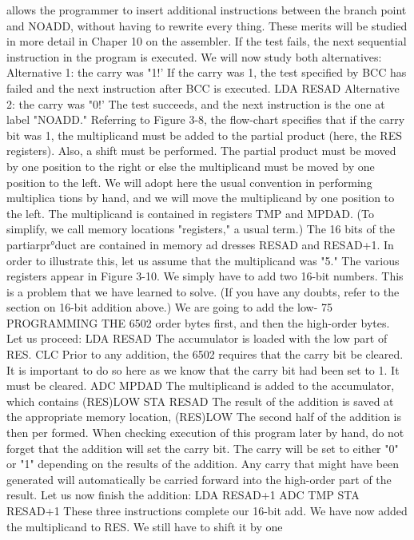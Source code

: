 \documentclass{book}
\begin{document}
allows the programmer to insert additional instructions between
the branch point and NOADD, without having to rewrite every
thing. These merits will be studied in more detail in Chaper 10 on
the assembler.
If the test fails, the next sequential instruction in the program
is executed. We will now study both alternatives:
Alternative 1: the carry was "1!'
If the carry was 1, the test specified by BCC has failed and the next
instruction after BCC is executed.
LDA RESAD
Alternative 2: the carry was "0!'
The test succeeds, and the next instruction is the one at label
"NOADD."
Referring to Figure 3-8, the flow-chart specifies that if the carry
bit was 1, the multiplicand must be added to the partial product
(here, the RES registers). Also, a shift must be performed. The
partial product must be moved by one position to the right or else
the multiplicand must be moved by one position to the left. We
will adopt here the usual convention in performing multiplica
tions by hand, and we will move the multiplicand by one position
to the left.
The multiplicand is contained in registers TMP and MPDAD.
(To simplify, we call memory locations "registers," a usual term.)
The 16 bits of the partiarpr°duct are contained in memory ad
dresses RESAD and RESAD+1.
In order to illustrate this, let us assume that the multiplicand
was "5." The various registers appear in Figure 3-10.
We simply have to add two 16-bit numbers. This is a problem
that we have learned to solve. (If you have any doubts, refer to
the section on 16-bit addition above.) We are going to add the low-
75
PROGRAMMING THE 6502
order bytes first, and then the high-order bytes. Let us proceed:
LDA RESAD
The accumulator is loaded with the low part of RES.
CLC
Prior to any addition, the 6502 requires that the carry bit be
cleared. It is important to do so here as we know that the carry bit
had been set to 1. It must be cleared.
ADC MPDAD
The multiplicand is added to the accumulator, which contains
(RES)LOW
STA RESAD
The result of the addition is saved at the appropriate memory
location, (RES)LOW The second half of the addition is then per
formed. When checking execution of this program later by hand,
do not forget that the addition will set the carry bit. The carry will
be set to either "0" or "1" depending on the results of the addition.
Any carry that might have been generated will automatically be
carried forward into the high-order part of the result.
Let us now finish the addition:
LDA RESAD+1
ADC TMP
STA RESAD+1
These three instructions complete our 16-bit add. We have now
added the multiplicand to RES. We still have to shift it by one
\end{document}
